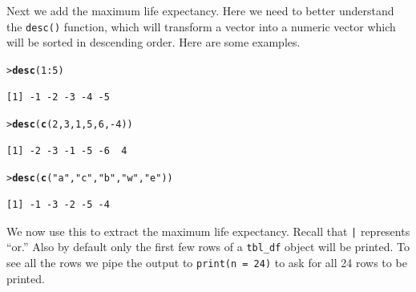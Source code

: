 \documentclass[12pt,oneside]{book}\usepackage[]{graphicx}\usepackage[]{color}
\makeatletter
\newcommand{\hlnum}[1]{\textcolor[rgb]{0.686,0.059,0.569}{#1}}%
\newcommand{\hlstr}[1]{\textcolor[rgb]{0.192,0.494,0.8}{#1}}%
\newcommand{\hlopt}[1]{\textcolor[rgb]{0,0,0}{#1}}%
\newcommand{\hlstd}[1]{\textcolor[rgb]{0.345,0.345,0.345}{#1}}%
\newcommand{\hlkwd}[1]{\textcolor[rgb]{0.737,0.353,0.396}{\textbf{#1}}}%
\newenvironment{kframe}{%
 \def\at@end@of@kframe{}%
 \ifinner\ifhmode%
  \def\at@end@of@kframe{\end{minipage}}%
  \begin{minipage}{\columnwidth}%
 \fi\fi%
 \def\FrameCommand##1{\hskip\@totalleftmargin \hskip-\fboxsep
 \colorbox{shadecolor}{##1}\hskip-\fboxsep
     \hskip-\linewidth \hskip-\@totalleftmargin \hskip\columnwidth}%
 \MakeFramed {\advance\hsize-\width
   \@totalleftmargin\z@ \linewidth\hsize
   \@setminipage}}%
 {\par\unskip\endMakeFramed%
 \at@end@of@kframe}
\newenvironment{knitrout}{}{} %
\newcommand{\Rfunc}[1]{\texttt{#1}}
\makeatother
\begin{document}
Next we add the maximum life expectancy. Here we need to better understand the \Rfunc{desc()} function, which will transform a vector into a numeric vector which will be sorted in descending order. Here are some examples.
\begin{knitrout}
\color{fgcolor}\begin{kframe}
\begin{alltt}
\hlstd{> }\hlkwd{desc}\hlstd{(}\hlnum{1}\hlopt{:}\hlnum{5}\hlstd{)}
\end{alltt}
\begin{verbatim}
[1] -1 -2 -3 -4 -5
\end{verbatim}
\begin{alltt}
\hlstd{> }\hlkwd{desc}\hlstd{(}\hlkwd{c}\hlstd{(}\hlnum{2}\hlstd{,} \hlnum{3}\hlstd{,} \hlnum{1}\hlstd{,} \hlnum{5}\hlstd{,} \hlnum{6}\hlstd{,} \hlopt{-}\hlnum{4}\hlstd{))}
\end{alltt}
\begin{verbatim}
[1] -2 -3 -1 -5 -6  4
\end{verbatim}
\begin{alltt}
\hlstd{> }\hlkwd{desc}\hlstd{(}\hlkwd{c}\hlstd{(}\hlstr{"a"}\hlstd{,} \hlstr{"c"}\hlstd{,} \hlstr{"b"}\hlstd{,} \hlstr{"w"}\hlstd{,} \hlstr{"e"}\hlstd{))}
\end{alltt}
\begin{verbatim}
[1] -1 -3 -2 -5 -4
\end{verbatim}
\end{kframe}
\end{knitrout}
We now use this to extract the maximum life expectancy. Recall that \verb+|+ represents ``or.'' Also by default only the first few rows of a \verb+tbl_df+ object will be printed. To see all the rows we pipe the output to \verb+print(n = 24)+ to ask for all 24 rows to be printed.
\end{document}
